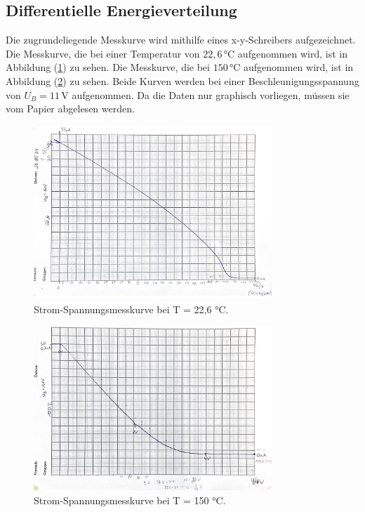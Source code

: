 \subsection{Differentielle Energieverteilung}
Die zugrundeliegende Messkurve wird mithilfe eines 
x-y-Schreibers aufgezeichnet. Die Messkurve, die bei einer 
Temperatur von $22,6 \, °\text{C}$ aufgenommen wird, ist 
in Abbildung (\ref{fig:22,6}) zu sehen. Die Messkurve, die bei 
$150 \, °\text{C}$ aufgenommen wird, ist in Abbildung 
(\ref{fig:150}) zu sehen. Beide Kurven werden bei einer
Beschleunigungsspannung von $U_B = 11 \, \unit{\volt}$
aufgenommen. Da die Daten nur graphisch vorliegen, 
müssen sie vom Papier abgelesen werden. 
\begin{figure}[H]
    \centering
    \includegraphics[width=0.8\textwidth]{content/Bilder/22,6.jpeg}
    \caption{Strom-Spannungsmesskurve bei T = 22,6 °C.}
    \label{fig:22,6}
\end{figure}
\begin{figure}[H]
    \centering
    \includegraphics[width=0.8\textwidth]{content/Bilder/150.jpeg}
    \caption{Strom-Spannungsmesskurve bei T = 150 °C.}
    \label{fig:150}
\end{figure}
